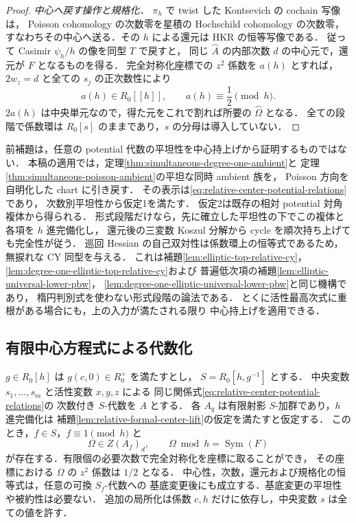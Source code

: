 \begin{proof}
\emph{中心へ戻す操作と規格化．}
$\pi_h$ で twist した Kontsevich の cochain 写像は，
Poisson cohomology の次数零を星積の Hochschild cohomology の次数零，
すなわちその中心へ送る．その $h$ による還元は HKR の恒等写像である．
従って Casimir $\psi_h/h$ の像を同型 $T$ で戻すと，
同じ $\widehat A$ の内部次数 $d$ の中心元で，還元が $F$ となるものを得る．
完全対称化座標での $z^2$ 係数を $a(h)$ とすれば，
$2w_z=d$ と全ての $s_j$ の正次数性により
\[
 a(h)\in R_0[[h]],\qquad a(h)\equiv\frac12\pmod h .
\]
$2a(h)$ は中央単元なので，得た元をこれで割れば所要の
$\widehat\Omega$ となる．
全ての段階で係数環は $R_0[s]$ のままであり，$s$ の分母は導入していない．
\end{proof}

\begin{remark}
前補題は，任意の potential 代数の平坦性を中心持上げから証明するものではない．
本稿の適用では，定理\ref{thm:simultaneous-degree-one-ambient}と
定理\ref{thm:simultaneous-poisson-ambient}の平坦な同時 ambient 族を，
Poisson 方向を自明化した chart に引き戻す．
その表示は\eqref{eq:relative-center-potential-relations}であり，
次数別平坦性から仮定1を満たす．
仮定2は既存の相対 potential 対角複体から得られる．
形式段階だけなら，先に確立した平坦性の下でこの複体と各項を $h$ 進完備化し，
還元後の三変数 Koszul 分解から cycle を順次持ち上げても完全性が従う．
巡回 Hessian の自己双対性は係数環上の恒等式であるため，無捩れな CY 同型を与える．
これは補題\ref{lem:elliptic-top-relative-cy}，
\ref{lem:degree-one-elliptic-top-relative-cy}および
普遍低次項の補題\ref{lem:elliptic-universal-lower-pbw}，
\ref{lem:degree-one-elliptic-universal-lower-pbw}と同じ機構であり，
楕円判別式を使わない形式段階の論法である．
とくに活性最高次式に重根がある場合にも，上の入力が満たされる限り
中心持上げを適用できる．
\end{remark}

\subsection{有限中心方程式による代数化}

\begin{proposition}[規格化中心の有限局所化による代数化]
\label{prop:relative-finite-center-lift}
$g\in R_0[h]$ は $g(c,0)\in R_0^\times$ を満たすとし，
$S=R_0[h,g^{-1}]$ とする．
中央変数 $s_1,\ldots,s_m$ と活性変数 $x,y,z$ による
同じ関係式\eqref{eq:relative-center-potential-relations}の
次数付き $S$-代数を $A$ とする．
各 $A_q$ は有限射影 $S$-加群であり，$h$ 進完備化は
補題\ref{lem:relative-formal-center-lift}の仮定を満たすと仮定する．
このとき，$f\in S$，$f\equiv1\pmod h$ と
\[
 \Omega\in Z(A_f)_d,\qquad
 \Omega\bmod h=\operatorname{Sym}(F)
\]
が存在する．有限個の必要次数で完全対称化を座標に取ることができ，
その座標における $\Omega$ の $z^2$ 係数は $1/2$ となる．
中心性，次数，還元および規格化の恒等式は，任意の可換 $S_f$-代数への
基底変更後にも成立する．基底変更の平坦性や被約性は必要ない．
追加の局所化は係数 $c,h$ だけに依存し，中央変数 $s$ は全ての値を許す．
\end{proposition}

